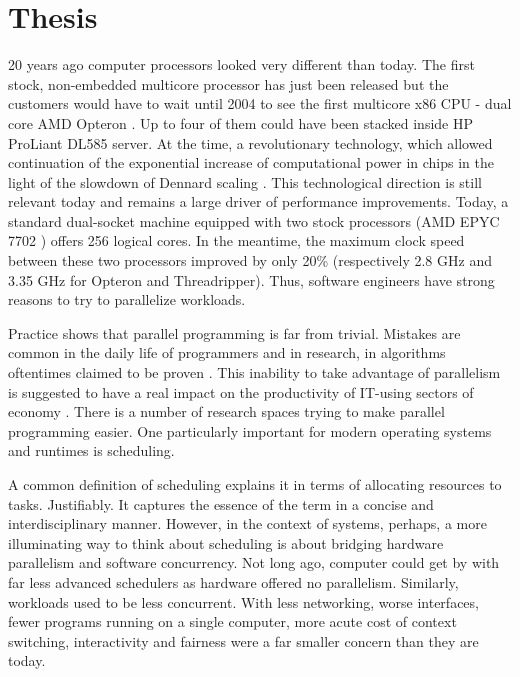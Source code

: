 \documentclass[12pt,a4paper,twoside]{report}
\begin{document}
\section{Thesis}
\label{section:thesis}
20 years ago computer processors looked very different than today. The first stock, non-embedded multicore processor has just been released \cite{POWER4Wi47:online} but the customers would have to wait until 2004 to see the first multicore x86 CPU - dual core AMD Opteron \cite{AMDAnnou13:online}. Up to four of them could have been stacked inside HP ProLiant DL585 server. At the time, a revolutionary technology, which allowed continuation of the exponential increase of computational power in chips \cite{mooremulti} in the light of the slowdown of Dennard scaling \cite{Bohr2007}. This technological direction is still relevant today and remains a large driver of performance improvements. Today, a standard dual-socket machine equipped with two stock processors (AMD EPYC 7702 \cite{2ndGenAM1:online}) offers 256 logical cores. In the meantime, the maximum clock speed between these two processors improved by only 20\% (respectively 2.8 GHz and 3.35 GHz for Opteron and Threadripper). Thus, software engineers have strong reasons to try to parallelize workloads. 

Practice shows that parallel programming is far from trivial. Mistakes are common in the daily life of programmers and in research, in algorithms oftentimes claimed to be proven \cite{Norris2013}. This inability to take advantage of parallelism is suggested to have a real impact on the productivity of IT-using sectors of economy \cite{Khan2018}. There is a number of research spaces trying to make parallel programming easier. One particularly important for modern operating systems and runtimes is scheduling. 

A common definition of scheduling explains it in terms of allocating resources to tasks. Justifiably. It captures the essence of the term in a concise and interdisciplinary manner. However, in the context of systems, perhaps, a more illuminating way to think about scheduling is about bridging hardware parallelism and software concurrency. Not long ago, computer could get by with far less advanced schedulers as hardware offered no parallelism. Similarly, workloads used to be less concurrent. With less networking, worse interfaces, fewer programs running on a single computer, more acute cost of context switching, interactivity and fairness were a far smaller concern than they are today. 
\end{document}
